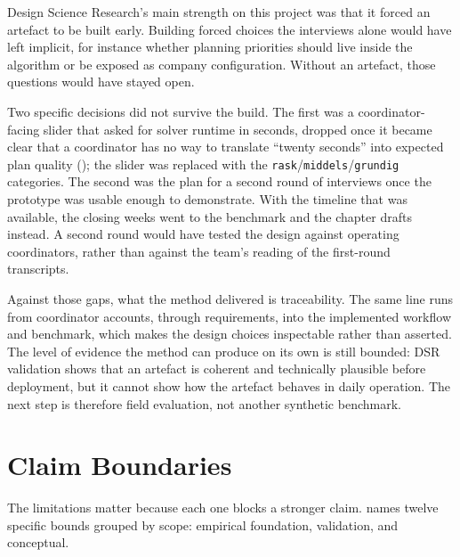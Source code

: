 Design Science Research's main strength on this project was that it forced an artefact to be built early. Building forced choices the interviews alone would have left implicit, for instance whether planning priorities should live inside the algorithm or be exposed as company configuration. Without an artefact, those questions would have stayed open.

Two specific decisions did not survive the build. The first was a coordinator-facing slider that asked for solver runtime in seconds, dropped once it became clear that a coordinator has no way to translate ``twenty seconds'' into expected plan quality (); the slider was replaced with the \texttt{rask}/\texttt{middels}/\texttt{grundig} categories. The second was the plan for a second round of interviews once the prototype was usable enough to demonstrate. With the timeline that was available, the closing weeks went to the benchmark and the chapter drafts instead. A second round would have tested the design against operating coordinators, rather than against the team's reading of the first-round transcripts.

Against those gaps, what the method delivered is traceability. The same line runs from coordinator accounts, through requirements, into the implemented workflow and benchmark, which makes the design choices inspectable rather than asserted. The level of evidence the method can produce on its own is still bounded: DSR validation shows that an artefact is coherent and technically plausible before deployment, but it cannot show how the artefact behaves in daily operation. The next step is therefore field evaluation, not another synthetic benchmark.


\section{Claim Boundaries}
\label{sec:limitations}

The limitations matter because each one blocks a stronger claim.  names twelve specific bounds grouped by scope: empirical foundation, validation, and conceptual.

